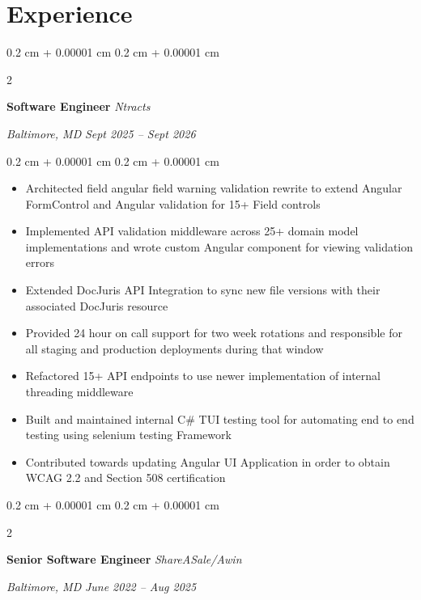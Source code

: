 \documentclass[10pt, letterpaper]{article}
\newenvironment{highlights}{
    \begin{itemize}[
        topsep=0.10 cm,
        parsep=0.10 cm,
        partopsep=0pt,
        itemsep=0pt,
        leftmargin=0.4 cm + 10pt
        ]
    }{
\end{itemize}
} %
\newenvironment{onecolentry}{
    \begin{adjustwidth}{
            0.2 cm + 0.00001 cm
        }{
            0.2 cm + 0.00001 cm
        }
    }{
    \end{adjustwidth}
} %
\newenvironment{twocolentry}[2][]{
    \onecolentry
    \def\secondColumn{#2}
    \setcolumnwidth{\fill, 10.5 cm}
    \begin{paracol}{2}
    }{
        \switchcolumn \raggedleft \secondColumn
    \end{paracol}
    \endonecolentry
} %
\begin{document}
\section{Experience}
\begin{twocolentry}{
    \textit{Baltimore, MD}
    \textit{Sept 2025 – Sept 2026}}
    \textbf{Software Engineer}
    \newline
    \textit{Ntracts}
\end{twocolentry}
\begin{onecolentry}
    \begin{highlights}
        \item Architected field angular field warning validation rewrite to extend Angular FormControl and Angular validation for 15+ Field controls
        \item Implemented API validation middleware across 25+ domain model implementations and wrote custom Angular component for viewing validation errors
        \item Extended DocJuris API Integration to sync new file versions with their associated DocJuris resource
        \item Provided 24 hour on call support for two week rotations and responsible for all staging and production deployments during that window
        \item Refactored 15+ API endpoints to use newer implementation of internal threading middleware 
        \item Built and maintained internal C\# TUI testing tool for automating end to end testing using selenium testing Framework
        \item Contributed towards updating Angular UI Application in order to obtain WCAG 2.2 and Section 508 certification
    \end{highlights}
\end{onecolentry}
\begin{twocolentry}{
    \textit{Baltimore, MD}
    \textit{June 2022 – Aug 2025}}
    \textbf{Senior Software Engineer}
    \newline
    \textit{ShareASale/Awin}
\end{twocolentry}
\end{document}
